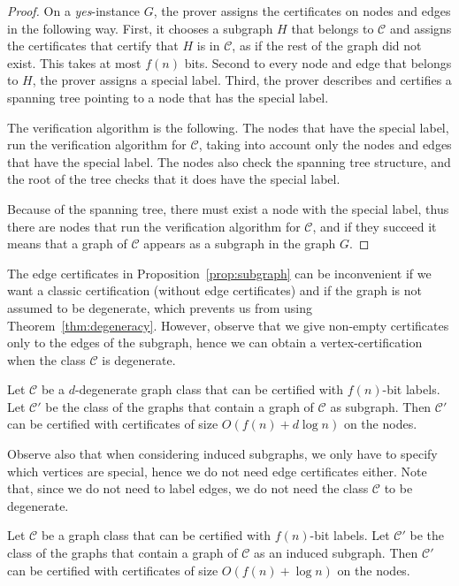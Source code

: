 \documentclass[a4paper,thm-restate,USenglish]{lipics-v2019}
\begin{document}
\begin{proof}
On a \emph{yes}-instance $G$, the prover assigns the certificates on nodes and edges in the following way. 
First, it chooses a subgraph $H$ that belongs to $\mathcal{C}$ and assigns the certificates that certify that $H$ is in $\mathcal{C}$, as if the rest of the graph did not exist. This takes at most $f(n)$ bits.
Second to every node and edge that belongs to $H$, the prover assigns a special label.
Third, the prover describes and certifies a spanning tree pointing to a node that has the special label.

The verification algorithm is the following. 
The nodes that have the special label, run the verification algorithm for $\mathcal{C}$, taking into account only the nodes and edges that have the special label. 
The nodes also check the spanning tree structure, and the root of the tree checks that it does have the special label.
    
Because of the spanning tree, there must exist a node with the special label, thus there are nodes that run the verification algorithm for $\mathcal{C}$, and if they succeed it means that a graph of $\mathcal{C}$ appears as a subgraph in the graph $G$.    
\end{proof}

The edge certificates in Proposition~\ref{prop:subgraph} can be inconvenient if we want a classic certification (without edge certificates) and if the graph is not assumed to be degenerate, which prevents us from using Theorem~\ref{thm:degeneracy}. However, observe that we give non-empty certificates only to the edges of the subgraph, hence we can obtain a vertex-certification when the class $\mathcal{C}$ is degenerate. 

\begin{corollary}
\label{cor:subgraph_deg}
Let $\mathcal{C}$ be a $d$-degenerate graph class that can be certified with $f(n)$-bit labels.
Let $\mathcal{C}'$ be the class of the graphs that contain a graph of $\mathcal{C}$ as subgraph. 
Then $\mathcal{C}'$ can be certified with certificates of size $O(f(n)+d\log n)$ on the nodes.
\end{corollary}

Observe also that when considering induced subgraphs, we only have to specify which vertices are special, hence we do not need edge certificates either. Note that, since we do not need to label edges, we do not need the class $\mathcal{C}$ to be degenerate.

\begin{corollary}
\label{cor:subgraph_induced}
Let $\mathcal{C}$ be a graph class that can be certified with $f(n)$-bit labels. 
Let $\mathcal{C}'$ be the class of the graphs that contain a graph of $\mathcal{C}$ as an induced subgraph. 
Then $\mathcal{C}'$ can be certified with certificates of size $O(f(n)+\log n)$ on the nodes.
\end{corollary}
\end{document}
